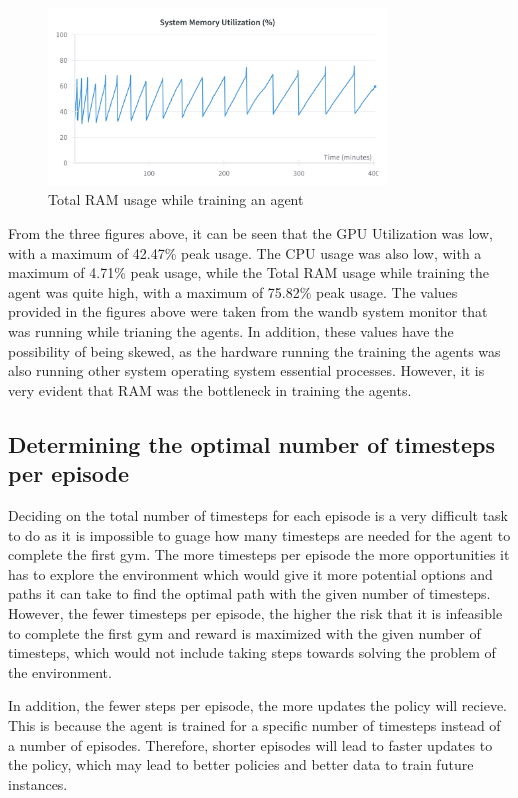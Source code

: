 \begin{figure}[H]
    \centering
    \includegraphics[width=0.8\textwidth]{figures/System_RAM_Utilization.png}
    \caption{Total RAM usage while training an agent}
    \label{fig:sys_memory_useage}
\end{figure}

From the three figures above, it can be seen that the GPU Utilization was low, with a maximum of 42.47\% peak usage. The CPU usage was also low, with a maximum of 4.71\% peak usage, while the Total RAM usage while training the agent was quite high, with a maximum of 75.82\% peak usage. The values provided in the figures above were taken from the wandb system monitor that was running while trianing the agents. In addition, these values have the possibility of being skewed, as the hardware running the training the agents was also running other system operating system essential processes. However, it is very evident that RAM was the bottleneck in training the agents.  

\subsection{Determining the optimal number of timesteps per episode}

Deciding on the total number of timesteps for each episode is a very difficult task to do as it is impossible to guage how many timesteps are needed for the agent to complete the first gym. The more timesteps per episode the more opportunities it has to explore the environment which would give it more potential options and paths it can take to find the optimal path with the given number of timesteps. However, the fewer timesteps per episode, the higher the risk that it is infeasible to complete the first gym and reward is maximized with the given number of timesteps, which would not include taking steps towards solving the problem of the environment. 

In addition, the fewer steps per episode, the more updates the policy will recieve. This is because the agent is trained for a specific number of timesteps instead of a number of episodes. Therefore, shorter episodes will lead to faster updates to the policy, which may lead to better policies and better data to train future instances. 


